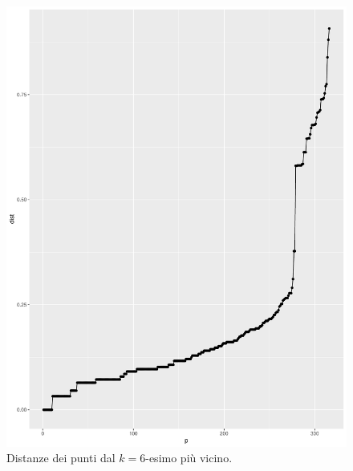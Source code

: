 \documentclass[12pt]{article}
\begin{document}
\begin{figure}[H]
\centering
	\includegraphics[width=\textwidth]{img/eps-minpts6.pdf}
	\caption{Distanze dei punti dal $k=6$-esimo più vicino.}
	\label{fig:eps-minpts6}
\end{figure}
\end{document}
